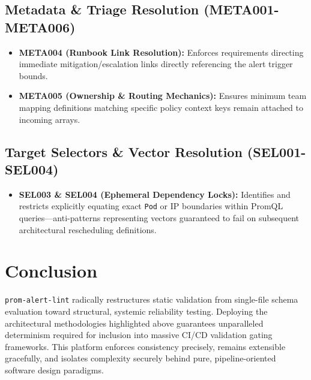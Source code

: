 \documentclass[a4paper,11pt]{article}
\begin{document}
\subsection{Metadata \& Triage Resolution (META001-META006)}
\begin{itemize}
    \item \textbf{META004 (Runbook Link Resolution):} Enforces requirements directing immediate mitigation/escalation links directly referencing the alert trigger bounds.
    \item \textbf{META005 (Ownership \& Routing Mechanics):} Ensures minimum team mapping definitions matching specific policy context keys remain attached to incoming arrays.
\end{itemize}

\subsection{Target Selectors \& Vector Resolution (SEL001-SEL004)}
\begin{itemize}
    \item  \textbf{SEL003 \& SEL004 (Ephemeral Dependency Locks):} Identifies and restricts explicitly equating exact \texttt{Pod} or IP boundaries within PromQL queries—anti-patterns representing vectors guaranteed to fail on subsequent architectural rescheduling definitions.
\end{itemize}

\section{Conclusion}
\texttt{prom-alert-lint} radically restructures static validation from single-file schema evaluation toward structural, systemic reliability testing. Deploying the architectural methodologies highlighted above guarantees unparalleled determinism required for inclusion into massive CI/CD validation gating frameworks. This platform enforces consistency precisely, remains extensible gracefully, and isolates complexity securely behind pure, pipeline-oriented software design paradigms.
\end{document}
